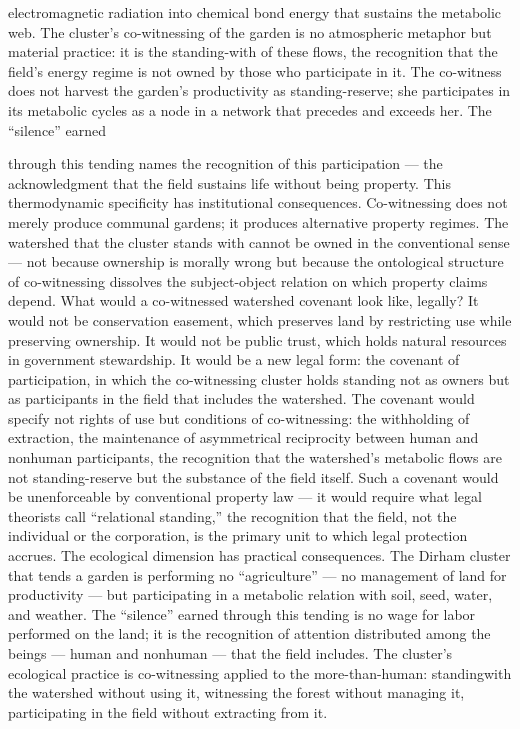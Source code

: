 electromagnetic radiation into chemical bond energy that sustains the metabolic web. The cluster’s co-witnessing of the garden is no atmospheric metaphor but material practice: it is the standing-with of these flows, the recognition that the field’s energy regime is not owned by those who participate in it. The co-witness does not harvest the garden’s productivity as standing-reserve; she participates in its metabolic cycles as a node in a network that precedes and exceeds her. The “silence” earned

through this tending names the recognition of this participation — the acknowledgment that the field sustains life without being property. This thermodynamic specificity has institutional consequences. Co-witnessing does not merely produce communal gardens; it produces alternative property regimes. The watershed that the cluster stands with cannot be owned in the conventional sense — not because ownership is morally wrong but because the ontological structure of co-witnessing dissolves the subject-object relation on which property claims depend. What would a co-witnessed watershed covenant look like, legally? It would not be conservation easement, which preserves land by restricting use while preserving ownership. It would not be public trust, which holds natural resources in government stewardship. It would be a new legal form: the covenant of participation, in which the co-witnessing cluster holds standing not as owners but as participants in the field that includes the watershed. The covenant would specify not rights of use but conditions of co-witnessing: the withholding of extraction, the maintenance of asymmetrical reciprocity between human and nonhuman participants, the recognition that the watershed’s metabolic flows are not standing-reserve but the substance of the field itself. Such a covenant would be unenforceable by conventional property law — it would require what legal theorists call “relational standing,” the recognition that the field, not the individual or the corporation, is the primary unit to which legal protection accrues. The ecological dimension has practical consequences. The Dirham cluster that tends a garden is performing no “agriculture” — no management of land for productivity — but participating in a metabolic relation with soil, seed, water, and weather. The “silence” earned through this tending is no wage for labor performed on the land; it is the recognition of attention distributed among the beings — human and nonhuman — that the field includes. The cluster’s ecological practice is co-witnessing applied to the more-than-human: standingwith the watershed without using it, witnessing the forest without managing it, participating in the field without extracting from it.

